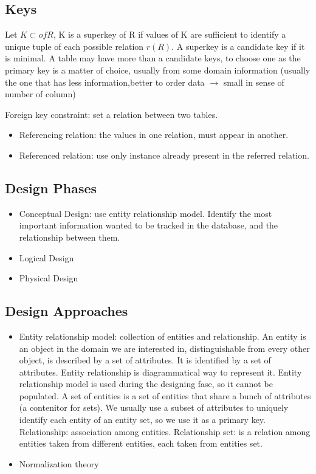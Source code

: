 \documentclass[11pt]{report}
\theoremstyle{definition}
\theoremstyle{remark}
\begin{document}
\subsection*{Keys}

Let $K \subset of R$, K is a superkey of R if values of K are sufficient to identify a unique tuple of each possible relation $r(R)$. A superkey is a candidate key if it is minimal. 
A table may have more than a candidate keys, to choose one as the primary key is a matter of choice, usually from some domain information (usually the one that has less information,better to order data $\rightarrow$ small in sense of number of column)

Foreign key constraint: set a relation between two tables.
\begin{itemize}
    \item Referencing relation: the values in one relation, must appear in another. 
    \item Referenced relation: use only instance already present in the referred relation.
\end{itemize}


\subsection*{Design Phases}
\begin{itemize}
    \item Conceptual Design: use entity relationship model. Identify the most important information wanted to be tracked in the database, and the relationship between them.
    \item Logical Design
    \item Physical Design
\end{itemize}

\subsection*{Design Approaches}
\begin{itemize}
    \item Entity relationship model: collection of entities and relationship. An entity is an object in the domain we are interested in, distinguishable from every other object, is described by a set of attributes. It is identified by a set of attributes. 
    Entity relationship is diagrammatical way to represent it. 
    Entity relationship model is used during the designing fase, so it cannot be populated.  A set of entities is a set of entities that share a bunch of attributes (a contenitor for sets). We usually use a subset of attributes to uniquely identify each entity of an entity set, so we use it as a primary key.
    Relationship: association among entities. Relationship set: is a relation among entities taken from different entities, each taken from entities set.
\item Normalization theory
\end{itemize}
\end{document}
